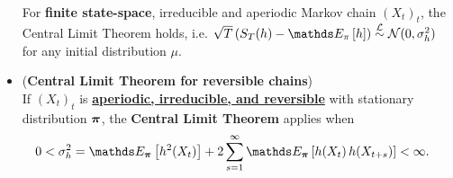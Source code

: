 \documentclass[11pt]{article}
\begin{document}
\begin{itemize}
\begin{corollary}\citep{liu2001monte}\\
For \textbf{finite state-space}, irreducible and aperiodic Markov chain $(X_t)_t$, the Central Limit Theorem holds, i.e. $\sqrt{T}\paren{S_T(h) - \E{\pi}{h}} \stackrel{\cL}{\sim} \cN(0, \sigma_{h}^2)$ for any initial distribution $\mu$.
\end{corollary}

\item \begin{theorem} (\textbf{Central Limit Theorem for reversible chains})\\
If $(X_t)_t$ is \underline{\textbf{aperiodic, irreducible, and reversible}} with stationary distribution $\boldsymbol{\pi}$, the \textbf{Central Limit Theorem} applies when
\begin{align}
0< \sigma_{h}^2 &= \E{\mb{\pi}}{h^2(X_t)} + 2\sum_{s=1}^{\infty}\E{\mb{\pi}}{h(X_t)\, h(X_{t+s})} < \infty. \label{eqn: mc_asym_variance}
\end{align}
\end{theorem}

%
\end{itemize}


\newpage


\end{document}
